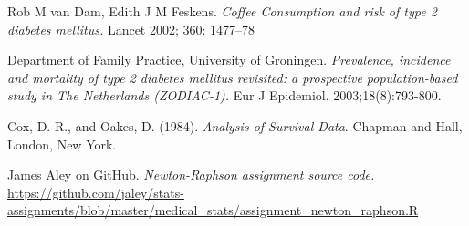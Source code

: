 \documentclass{article}
\begin{document}
\begin{thebibliography}{9}

Rob M van Dam, Edith J M Feskens.
\textit{Coffee Consumption and risk of type 2 diabetes mellitus.}
Lancet 2002; 360: 1477–78

Department of Family Practice, University of Groningen.
\emph{Prevalence, incidence and mortality of type 2 diabetes mellitus
revisited: a prospective population-based study in The Netherlands
(ZODIAC-1).}
Eur J Epidemiol. 2003;18(8):793-800.

Cox, D. R., and Oakes, D. (1984).
\emph{Analysis of Survival Data}.
Chapman and Hall, London, New York.

James Aley on GitHub.
\emph{Newton-Raphson assignment source code.}
\url{https://github.com/jaley/stats-assignments/blob/master/medical_stats/assignment_newton_raphson.R}

\end{thebibliography}
\end{document}
